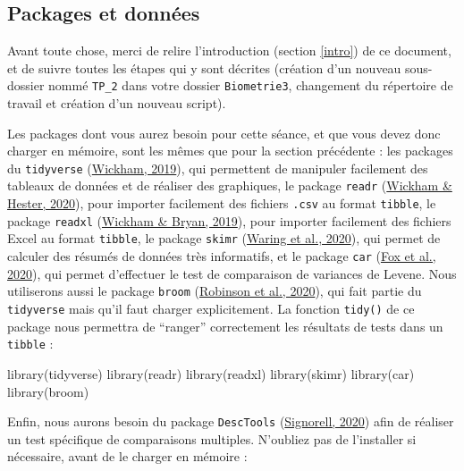 \documentclass[
  a4paper,
]{article}
\newenvironment{Shaded}{\begin{snugshade}}{\end{snugshade}}
\newcommand{\FunctionTok}[1]{\textcolor[rgb]{0.39,0.29,0.61}{#1}}
\newcommand{\NormalTok}[1]{\textcolor[rgb]{0.12,0.11,0.11}{#1}}
\begin{document}
\hypertarget{packages-et-donnuxe9es}{%
\subsection{Packages et données}\label{packages-et-donnuxe9es}}

Avant toute chose, merci de relire l'introduction (section \ref{intro}) de ce document, et de suivre toutes les étapes qui y sont décrites (création d'un nouveau sous-dossier nommé \texttt{TP\_2} dans votre dossier \texttt{Biometrie3}, changement du répertoire de travail et création d'un nouveau script).

Les packages dont vous aurez besoin pour cette séance, et que vous devez donc charger en mémoire, sont les mêmes que pour la section précédente : les packages du \texttt{tidyverse} (\protect\hyperlink{ref-R-tidyverse}{Wickham, 2019}), qui permettent de manipuler facilement des tableaux de données et de réaliser des graphiques, le package \texttt{readr} (\protect\hyperlink{ref-R-readr}{Wickham \& Hester, 2020}), pour importer facilement des fichiers \texttt{.csv} au format \texttt{tibble}, le package \texttt{readxl} (\protect\hyperlink{ref-R-readxl}{Wickham \& Bryan, 2019}), pour importer facilement des fichiers Excel au format \texttt{tibble}, le package \texttt{skimr} (\protect\hyperlink{ref-R-skimr}{Waring et al., 2020}), qui permet de calculer des résumés de données très informatifs, et le package \texttt{car} (\protect\hyperlink{ref-R-car}{Fox et al., 2020}), qui permet d'effectuer le test de comparaison de variances de Levene. Nous utiliserons aussi le package \texttt{broom} (\protect\hyperlink{ref-R-broom}{Robinson et al., 2020}), qui fait partie du \texttt{tidyverse} mais qu'il faut charger explicitement. La fonction \texttt{tidy()} de ce package nous permettra de ``ranger'' correctement les résultats de tests dans un \texttt{tibble} :

\begin{Shaded}
\begin{Highlighting}[]
\FunctionTok{library}\NormalTok{(tidyverse)}
\FunctionTok{library}\NormalTok{(readr)}
\FunctionTok{library}\NormalTok{(readxl)}
\FunctionTok{library}\NormalTok{(skimr)}
\FunctionTok{library}\NormalTok{(car)}
\FunctionTok{library}\NormalTok{(broom)}
\end{Highlighting}
\end{Shaded}

Enfin, nous aurons besoin du package \texttt{DescTools} (\protect\hyperlink{ref-R-DescTools}{Signorell, 2020}) afin de réaliser un test spécifique de comparaisons multiples. N'oubliez pas de l'installer si nécessaire, avant de le charger en mémoire :
\end{document}
